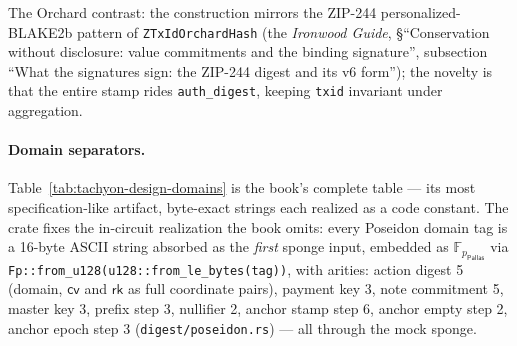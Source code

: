\documentclass[11pt,a4paper]{article}
\theoremstyle{definition}
\newcommand{\F}{\mathbb{F}}
\newcommand{\cvsym}{\mathsf{cv}}
\newcommand{\rk}{\mathsf{rk}}
\newcommand{\Pallas}{\ensuremath{\mathsf{Pallas}}}
\begin{document}
The Orchard contrast: the construction mirrors the ZIP-244
personalized-BLAKE2b pattern of \texttt{ZTxIdOrchardHash} (the
\emph{Ironwood Guide}, \S``Conservation without disclosure: value commitments
and the binding signature'', subsection ``What the signatures sign: the
ZIP-244 digest and its v6 form'');
the
novelty is that the entire stamp rides \texttt{auth\_digest}, keeping
\texttt{txid} invariant under aggregation.

\paragraph{Domain separators.} Table~\ref{tab:tachyon-design-domains} is
the book's complete table --- its most specification-like artifact,
byte-exact strings each realized as a code constant. The crate fixes the
in-circuit realization the book omits: every Poseidon domain tag is a
16-byte ASCII string absorbed as the \emph{first} sponge input, embedded
as $\F_{p_{\Pallas}}$ via
\texttt{Fp::from\_u128(u128::from\_le\_bytes(tag))}, with arities: action
digest 5 (domain, $\cvsym$ and $\rk$ as full coordinate pairs), payment
key 3, note commitment 5, master key 3, prefix step 3, nullifier 2, anchor
stamp step 6, anchor empty step 2, anchor epoch step 3
(\texttt{digest/poseidon.rs}) --- all through the mock sponge.
\end{document}
